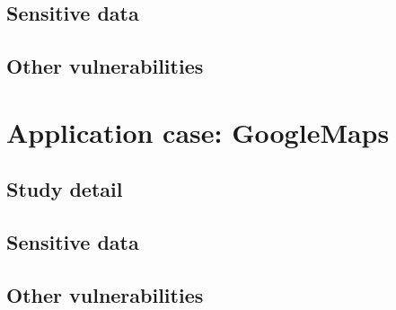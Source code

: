 		\subsection{Sensitive data}
		\subsection{Other vulnerabilities}

	\section{Application case: GoogleMaps}
	\label{sec:google_maps}
		\subsection{Study detail}
		\subsection{Sensitive data}
		\subsection{Other vulnerabilities}
